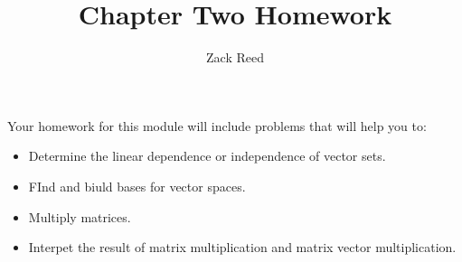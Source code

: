 \documentclass{ximera}
\author{Zack Reed}
\title{Chapter Two Homework}
\begin{document}
 
\begin{abstract}
\end{abstract}
 
\maketitle
 
Your homework for this module will include problems that will help you to:
 
\begin{itemize}
\item Determine the linear dependence or independence of vector sets.
\item FInd and biuld bases for vector spaces.
\item Multiply matrices.
\item Interpet the result of matrix multiplication and matrix vector multiplication.
\end{itemize}
 
 
\end{document}
